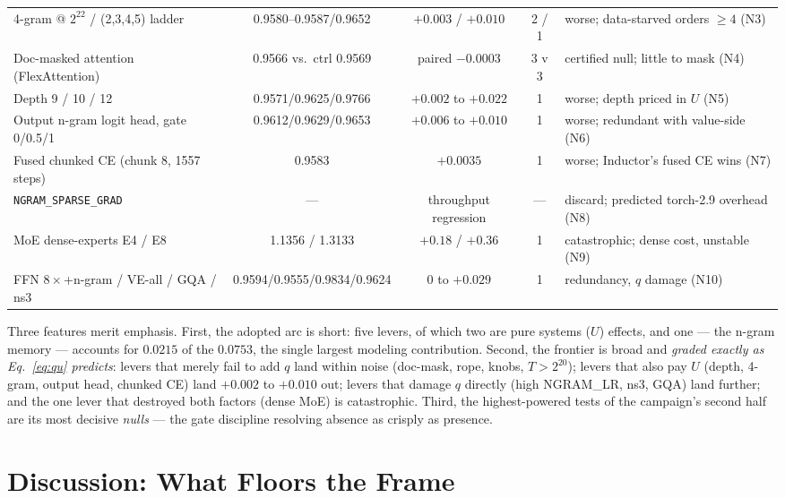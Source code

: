 \documentclass{article}
\begin{document}
\begin{table}[t]
\begin{center}
\begin{scriptsize}
{\begin{tabular}{lcccl}
4-gram @ $2^{22}$ / (2,3,4,5) ladder & 0.9580--0.9587/0.9652 & $+0.003$ / $+0.010$ & 2 / 1 & worse; data-starved orders $\geq 4$ (N3) \\
Doc-masked attention (FlexAttention) & 0.9566 vs.\ ctrl 0.9569 & paired $-0.0003$ & 3 v 3 & certified null; little to mask (N4) \\
Depth 9 / 10 / 12 & 0.9571/0.9625/0.9766 & $+0.002$ to $+0.022$ & 1 & worse; depth priced in $U$ (N5) \\
Output n-gram logit head, gate 0/0.5/1 & 0.9612/0.9629/0.9653 & $+0.006$ to $+0.010$ & 1 & worse; redundant with value-side (N6) \\
Fused chunked CE (chunk 8, 1557 steps) & 0.9583 & $+0.0035$ & 1 & worse; Inductor's fused CE wins (N7) \\
\texttt{NGRAM\_SPARSE\_GRAD} & --- & throughput regression & --- & discard; predicted torch-2.9 overhead (N8) \\
MoE dense-experts E4 / E8 & 1.1356 / 1.3133 & $+0.18$ / $+0.36$ & 1 & catastrophic; dense cost, unstable (N9) \\
FFN $8\times$+n-gram / VE-all / GQA / ns3 & 0.9594/0.9555/0.9834/0.9624 & $0$ to $+0.029$ & 1 & redundancy, $q$ damage (N10) \\
\bottomrule
\end{tabular}%
}
\end{scriptsize}
\end{center}
\vskip -0.1in
\end{table}

Three features merit emphasis. First, the adopted arc is short: five levers, of which two are pure systems ($U$) effects, and one --- the n-gram memory --- accounts for $0.0215$ of the $0.0753$, the single largest modeling contribution. Second, the frontier is broad and \emph{graded exactly as Eq.~\ref{eq:qu} predicts}: levers that merely fail to add $q$ land within noise (doc-mask, rope, knobs, $T > 2^{20}$); levers that also pay $U$ (depth, 4-gram, output head, chunked CE) land $+0.002$ to $+0.010$ out; levers that damage $q$ directly (high NGRAM\_LR, ns3, GQA) land further; and the one lever that destroyed both factors (dense MoE) is catastrophic. Third, the highest-powered tests of the campaign's second half are its most decisive \emph{nulls} --- the gate discipline resolving absence as crisply as presence.

\section{Discussion: What Floors the Frame}
\label{sec:discussion}
\end{document}
